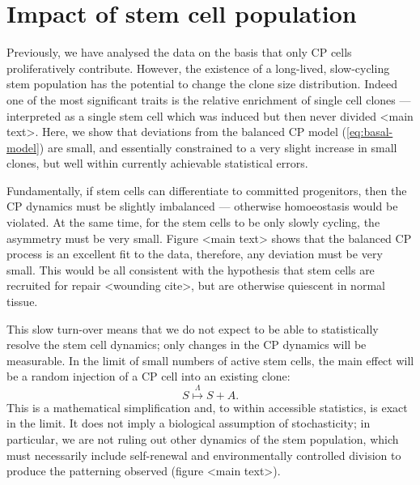\documentclass[10pt,UKenglish]{article}
\begin{document}
\section{\label{sec:stem}Impact of stem cell population}

Previously, we have analysed the data on the basis that only CP cells proliferatively contribute. However, the existence of a long-lived, slow-cycling stem population has the potential to change the clone size distribution. Indeed one of the most significant traits is the relative enrichment of single cell clones --- interpreted as a single stem cell which was induced but then never divided <main text>. Here, we show that deviations from the balanced CP model (\ref{eq:basal-model}) are small, and essentially constrained to a very slight increase in small clones, but well within currently achievable statistical errors.

Fundamentally, if stem cells can differentiate to committed progenitors, then the CP dynamics must be slightly imbalanced --- otherwise homoeostasis would be violated. At the same time, for the stem cells to be only slowly cycling, the asymmetry must be very small. Figure <main text> shows that the balanced CP process is an excellent fit to the data, therefore, any deviation must be very small. This would be all consistent with the hypothesis that stem cells are recruited for repair <wounding cite>, but are otherwise quiescent in normal tissue.

This slow turn-over means that we do not expect to be able to statistically resolve the stem cell dynamics; only changes in the CP dynamics will be measurable. In the limit of small numbers of active stem cells, the main effect will be a random injection of a CP cell into an existing clone: 
\begin{equation}
S \overset{\Lambda}{\longmapsto} S+A. \label{eq:stem-division-model}
\end{equation}
This is a mathematical simplification and, to within accessible statistics, is exact in the limit. It does not imply a biological assumption of stochasticity; in particular, we are not ruling out other dynamics of the stem population, which must necessarily include self-renewal and environmentally controlled division to produce the patterning observed (figure <main text>).
\end{document}
